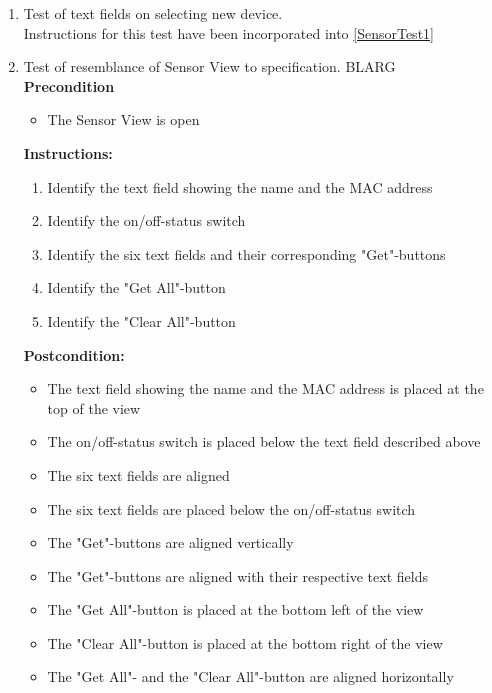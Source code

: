 \documentclass[a4paper]{article}
\newlength{\testlabellength}
\newenvironment{testlist}{\begin{enumerate}[label=\bfseries Instruction \thesubsection.\arabic* , labelindent=0pt, labelwidth=\testlabellength , leftmargin=2cm]}{\end{enumerate}}
\newenvironment{precondition}{
{\color{white}BLARG}\\ 
\textbf{Precondition}
\begin{itemize}[labelindent=0cm, labelwidth=2cm , leftmargin=1cm]
}
{\end{itemize}}
\newenvironment{instruction}{
\textbf{Instructions:}
\begin{enumerate}[label=\bfseries  \arabic*., labelindent=0cm, labelwidth=2cm , leftmargin=1cm]
}
{\end{enumerate}}
\newenvironment{postcondition}{
\textbf{Postcondition:}
\begin{itemize}[labelindent=0cm, labelwidth=2cm , leftmargin=1cm]
}
{\end{itemize}}
\begin{document}
\begin{appendices}
\begin{testlist}

	\item Test of text fields on selecting new device. \\
		Instructions for this test have been incorporated into \ref{SensorTest1}


	\item Test of resemblance of Sensor View to specification.
		\begin{precondition}
			\item The Sensor View is open
		\end{precondition}
		\begin{instruction}
			\item Identify the text field showing the name and the MAC address
			\item Identify the on/off-status switch
			\item Identify the six text fields and their corresponding "Get"-buttons
			\item Identify the "Get All"-button
			\item Identify the "Clear All"-button
		\end{instruction}
		\begin{postcondition}
			\item The text field showing the name and the MAC address is placed at the top of the view
			\item The on/off-status switch is placed below the text field described above
			\item The six text fields are aligned
			\item The six text fields are placed below the on/off-status switch
			\item The "Get"-buttons are aligned vertically
			\item The "Get"-buttons are aligned with their respective text fields
			\item The "Get All"-button is placed at the bottom left of the view
			\item The "Clear All"-button is placed at the bottom right of the view
			\item The "Get All"- and the "Clear All"-button are aligned horizontally
		\end{postcondition}
\end{testlist}


\end{appendices}
\end{document}
